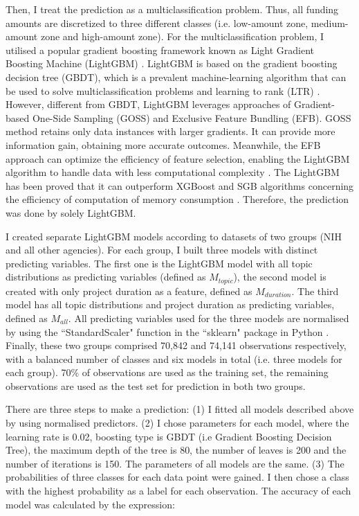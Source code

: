 Then, I treat the prediction as a multiclassification problem. Thus, all funding amounts are discretized to three different classes (i.e. low-amount zone, medium-amount zone and high-amount zone). For the multiclassification problem, I utilised a popular gradient boosting framework known as Light Gradient Boosting Machine (LightGBM) \cite{Ke2017}. LightGBM is based on the gradient boosting decision tree (GBDT), which is a prevalent machine-learning algorithm \cite{jerome2001} that can be used to solve multiclassification problems \cite{li2010} and learning to rank (LTR) \cite{burges2010}. However, different from GBDT, LightGBM leverages approaches of Gradient-based One-Side Sampling (GOSS) and Exclusive Feature Bundling (EFB). GOSS method retains only data instances with larger gradients. It can provide more information gain, obtaining more accurate outcomes. Meanwhile, the EFB approach can optimize the efficiency of feature selection, enabling the LightGBM algorithm to handle data with less computational complexity \cite{Ke2017}. The LightGBM has been proved that it can outperform XGBoost and SGB algorithms concerning the efficiency of computation of memory consumption \cite{Ke2017}. Therefore, the prediction was done by solely LightGBM.

I created separate LightGBM models according to datasets of two groups (NIH and all other agencies). For each group, I built three models with distinct predicting variables. The first one is the LightGBM model with all topic distributions as predicting variables (defined as $M_{topic}$), the second model is created with only project duration as a feature, defined as $M_{duration}$. The third model has all topic distributions and project duration as predicting variables, defined as $M_{all}$. All predicting variables used for the three models are normalised by using the ``StandardScaler" function in the ``sklearn" package in Python \cite{sklearn}. Finally, these two groups comprised 70,842 and 74,141 observations respectively, with a balanced number of classes and six models in total (i.e. three models for each group). 70\% of observations are used as the training set, the remaining observations are used as the test set for prediction in both two groups.

There are three steps to make a prediction: (1) I fitted all models described above by using normalised predictors. (2) I chose parameters for each model, where the learning rate is 0.02, boosting type is GBDT (i.e Gradient Boosting Decision Tree), the maximum depth of the tree is 80, the number of leaves is 200 and the number of iterations is 150. The parameters of all models are the same. (3) The probabilities of three classes for each data point were gained. I then chose a class with the highest probability as a label for each observation. The accuracy of each model was calculated by the expression:

